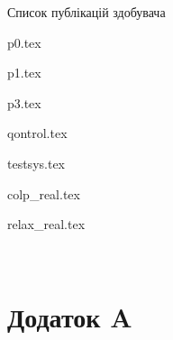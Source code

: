 \documentclass[13pt,d,ukrlang]{vakthesisatu}
\author{\dissauthorFullRu}
\title{\bookname}
\date{\bookyear}
\begin{document}






\medskip

\begin{center}
Список публікацій здобувача
\end{center}



\clearpage
{}
{}
\tableofcontents




{p0.tex} %

{p1.tex} %


{p3.tex} %

{qontrol.tex} %

{testsys.tex} %

{colp_real.tex} %

{relax_real.tex} %






\clearpage
{}

\printbibliography[sorting=nty,title=СПИСОК ВИКОРИСТАНИХ ДЖЕРЕЛ]
\label{e:atu}{~}

\clearpage
{}
\vspace{-7ex}
\chapter*{Додаток A}
\end{document}
